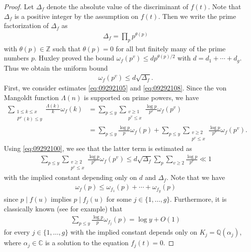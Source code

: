 \documentclass[a4paper,11pt]{amsart}
\theoremstyle{definition}
\numberwithin{equation}{section}
\begin{document}
\begin{proof}
Let $\Delta_f$ denote the absolute value of the discriminant of $f(t)$. 
Note that $\Delta_f$ is a positive integer by the assumption on $f(t)$. 
Then we write the prime factorization of $\Delta_f$ as 
\begin{align*}
\Delta_f
= \prod_{p} p^{\theta(p)} 
\end{align*}
with $\theta(p) \in \mathbb{Z}$ such that $\theta(p)=0$ for all but finitely many of the prime numbers $p$. 
Huxley \cite{Huxley1981} proved the bound $\omega_f(p^v)\leq d p^{\theta(p)/2}$ with $d=d_1+\cdots+d_g$. 
Thus we obtain the uniform bound
\begin{align}\label{eq:09292100}
\omega_f(p^v)
\leq d \sqrt{\Delta_f}. 
\end{align}
First, we consider estimates \eqref{eq:09292105} and \eqref{eq:09292108}. 
Since the von Mangoldt function $\Lambda(n)$ is supported on prime powers, we have
\begin{align}\label{eq:09292125}
\sum_{\substack{1 \leq k \leq x \\ P^+(k) \leq y}} \frac{\Lambda(k)}{k} \omega_f(k)
&= \sum_{p \leq y} \sum_{\substack{v \geq1 \\ p^v \leq x}} \frac{\log{p}}{p^v} \omega_f(p^v) \\
&= \sum_{p \leq y} \frac{\log{p}}{p} \omega_f(p)
+ \sum_{p \leq y} \sum_{\substack{v \geq2 \\ p^v \leq x}} \frac{\log{p}}{p^v} \omega_f(p^v). \nonumber
\end{align}
Using \eqref{eq:09292100}, we see that the latter term is estimated as
\begin{align}\label{eq:09292126}
\sum_{p \leq y} \sum_{\substack{v \geq2 \\ p^v \leq x}} \frac{\log{p}}{p^v} \omega_f(p^v)
\leq d \sqrt{\Delta_f} \sum_{p} \sum_{v \geq2} \frac{\log{p}}{p^v} 
\ll 1
\end{align}
with the implied constant depending only on $d$ and $\Delta_f$.
Note that we have
\begin{align*}
\omega_f(p)
\leq \omega_{f_1}(p)+\cdots+\omega_{f_g}(p)
\end{align*}
since $p \mid f(u)$ implies $p \mid f_j(u)$ for some $j \in \{1,\ldots,g\}$. 
Furthermore, it is classically known (see \cite{Nagel1921} for example) that
\begin{align}\label{eq:10101700}
\sum_{p \leq y} \frac{\log{p}}{p} \omega_{f_j}(p)
= \log{y}+O(1) 
\end{align}
for every $j \in \{1,\ldots,g\}$ with the implied constant depends only on $K_j=\mathbb{Q}(\alpha_j)$, where $\alpha_j \in \mathbb{C}$ is a solution to the equation $f_j(t)=0$. 

\end{proof}
\end{document}

